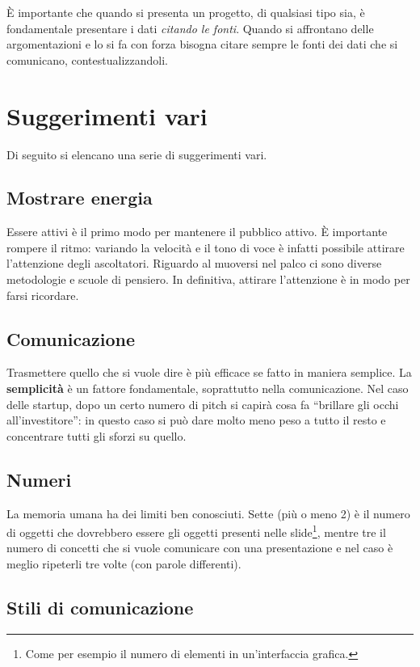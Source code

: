 È importante che quando si presenta un progetto, di qualsiasi tipo sia, è
fondamentale presentare i dati \textit{citando le fonti}.
Quando si affrontano delle argomentazioni e lo si fa con forza bisogna citare
sempre le fonti dei dati che si comunicano, contestualizzandoli.

\section{Suggerimenti vari}

Di seguito si elencano una serie di suggerimenti vari.

\subsection{Mostrare energia}

Essere attivi è il primo modo per mantenere il pubblico attivo. È
importante rompere il ritmo: variando la velocità e il tono di voce è
infatti possibile attirare l'attenzione degli ascoltatori. Riguardo al
muoversi nel palco ci sono diverse metodologie e scuole di pensiero. In
definitiva, attirare l'attenzione è in modo per farsi ricordare.

\subsection{Comunicazione}

Trasmettere quello che si vuole dire è più efficace se fatto in maniera
semplice. La \textbf{semplicità} è un fattore fondamentale, soprattutto nella
comunicazione. Nel caso delle startup, dopo un certo numero di pitch si capirà
cosa fa ``brillare gli occhi all'investitore'': in questo caso si può dare
molto meno peso a tutto il resto e concentrare tutti gli sforzi su quello.

\subsection{Numeri}

La memoria umana ha dei limiti ben conosciuti. Sette (più o meno 2) è il numero
di oggetti che dovrebbero essere gli oggetti presenti nelle slide\footnote{Come
per esempio il numero di elementi in un'interfaccia grafica.}, mentre tre il
numero di concetti che si vuole comunicare con una presentazione e nel caso è
meglio ripeterli tre volte (con parole differenti).

\subsection{Stili di comunicazione}

